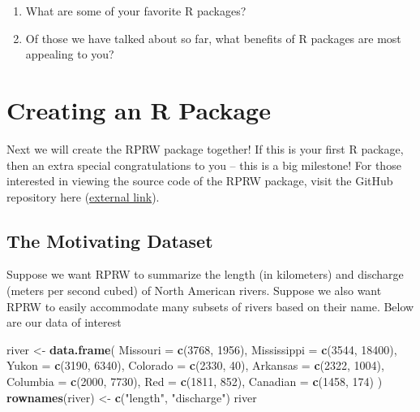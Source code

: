 \documentclass[
]{book}
\newenvironment{Shaded}{\begin{snugshade}}{\end{snugshade}}
\newcommand{\DataTypeTok}[1]{\textcolor[rgb]{0.13,0.29,0.53}{#1}}
\newcommand{\DecValTok}[1]{\textcolor[rgb]{0.00,0.00,0.81}{#1}}
\newcommand{\KeywordTok}[1]{\textcolor[rgb]{0.13,0.29,0.53}{\textbf{#1}}}
\newcommand{\NormalTok}[1]{#1}
\newcommand{\StringTok}[1]{\textcolor[rgb]{0.31,0.60,0.02}{#1}}
\begin{document}
\begin{enumerate}
\def\labelenumi{\arabic{enumi}.}
\item
  What are some of your favorite R packages?
\item
  Of those we have talked about so far, what benefits of R packages are most appealing to you?
\end{enumerate}

\hypertarget{creating-an-r-package}{%
\section{Creating an R Package}\label{creating-an-r-package}}

Next we will create the RPRW package together! If this is your first R package, then an extra special congratulations to you -- this is a big milestone! For those interested in viewing the source code of the RPRW package, visit the GitHub repository here (\href{https://github.com/michaeldumelle/RPRW}{external link}).

\hypertarget{the-motivating-dataset}{%
\subsection{The Motivating Dataset}\label{the-motivating-dataset}}

Suppose we want RPRW to summarize the length (in kilometers) and discharge (meters per second cubed) of North American rivers. Suppose we also want RPRW to easily accommodate many subsets of rivers based on their name. Below are our data of interest

\begin{Shaded}
\begin{Highlighting}[]
\NormalTok{river <-}\StringTok{ }\KeywordTok{data.frame}\NormalTok{(}
  \DataTypeTok{Missouri =} \KeywordTok{c}\NormalTok{(}\DecValTok{3768}\NormalTok{, }\DecValTok{1956}\NormalTok{),}
  \DataTypeTok{Mississippi =} \KeywordTok{c}\NormalTok{(}\DecValTok{3544}\NormalTok{, }\DecValTok{18400}\NormalTok{),}
  \DataTypeTok{Yukon =} \KeywordTok{c}\NormalTok{(}\DecValTok{3190}\NormalTok{, }\DecValTok{6340}\NormalTok{),}
  \DataTypeTok{Colorado =} \KeywordTok{c}\NormalTok{(}\DecValTok{2330}\NormalTok{, }\DecValTok{40}\NormalTok{),}
  \DataTypeTok{Arkansas =} \KeywordTok{c}\NormalTok{(}\DecValTok{2322}\NormalTok{, }\DecValTok{1004}\NormalTok{),}
  \DataTypeTok{Columbia =} \KeywordTok{c}\NormalTok{(}\DecValTok{2000}\NormalTok{, }\DecValTok{7730}\NormalTok{),}
  \DataTypeTok{Red =} \KeywordTok{c}\NormalTok{(}\DecValTok{1811}\NormalTok{, }\DecValTok{852}\NormalTok{),}
  \DataTypeTok{Canadian =} \KeywordTok{c}\NormalTok{(}\DecValTok{1458}\NormalTok{, }\DecValTok{174}\NormalTok{)}
\NormalTok{) }
\KeywordTok{rownames}\NormalTok{(river) <-}\StringTok{ }\KeywordTok{c}\NormalTok{(}\StringTok{"length"}\NormalTok{, }\StringTok{"discharge"}\NormalTok{)}
\NormalTok{river}
\end{Highlighting}
\end{Shaded}
\end{document}
